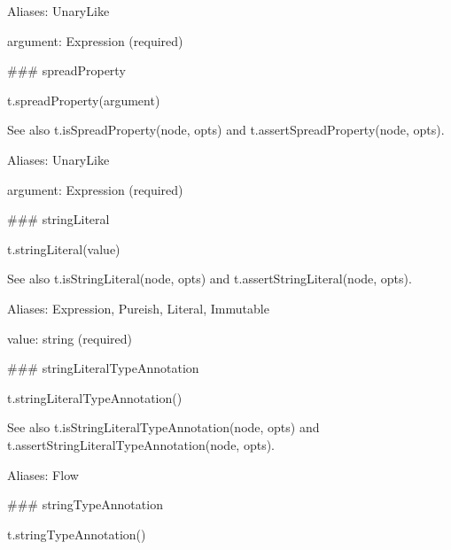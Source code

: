 Aliases\+: {\ttfamily Unary\+Like}


\begin{DoxyItemize}
\item {\ttfamily argument}\+: {\ttfamily Expression} (required) 


\end{DoxyItemize}

\#\#\# spread\+Property 
\begin{DoxyCode}
t.spreadProperty(argument)
\end{DoxyCode}


See also {\ttfamily t.\+is\+Spread\+Property(node, opts)} and {\ttfamily t.\+assert\+Spread\+Property(node, opts)}.

Aliases\+: {\ttfamily Unary\+Like}


\begin{DoxyItemize}
\item {\ttfamily argument}\+: {\ttfamily Expression} (required) 


\end{DoxyItemize}

\#\#\# string\+Literal 
\begin{DoxyCode}
t.stringLiteral(value)
\end{DoxyCode}


See also {\ttfamily t.\+is\+String\+Literal(node, opts)} and {\ttfamily t.\+assert\+String\+Literal(node, opts)}.

Aliases\+: {\ttfamily Expression}, {\ttfamily Pureish}, {\ttfamily Literal}, {\ttfamily Immutable}


\begin{DoxyItemize}
\item {\ttfamily value}\+: {\ttfamily string} (required) 


\end{DoxyItemize}

\#\#\# string\+Literal\+Type\+Annotation 
\begin{DoxyCode}
t.stringLiteralTypeAnnotation()
\end{DoxyCode}


See also {\ttfamily t.\+is\+String\+Literal\+Type\+Annotation(node, opts)} and {\ttfamily t.\+assert\+String\+Literal\+Type\+Annotation(node, opts)}.

Aliases\+: {\ttfamily Flow}





\#\#\# string\+Type\+Annotation 
\begin{DoxyCode}
t.stringTypeAnnotation()
\end{DoxyCode}


